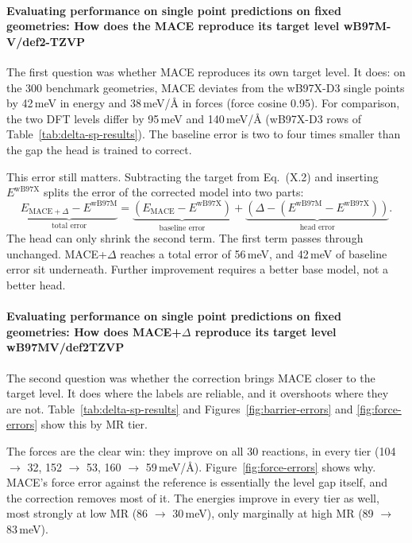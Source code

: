 \paragraph{Evaluating performance on single point predictions on fixed geometries: How does the MACE reproduce its target level wB97M-V/def2-TZVP}
The first question was whether MACE reproduces its own target level. It
does: on the 300 benchmark geometries, MACE deviates from the wB97X-D3
single points by 42\,meV in energy and 38\,meV/\AA{} in forces (force
cosine 0.95). For comparison, the two DFT levels differ by 95\,meV and
140\,meV/\AA{} (wB97X-D3 rows of Table~\ref{tab:delta-sp-results}). The
baseline error is two to four times smaller than the gap the head is
trained to correct.

This error still matters. Subtracting the target from Eq.~(X.2) and
inserting $E^{\text{wB97X}}$ splits the error of the corrected model into
two parts:
\begin{equation}
\underbrace{E_{\text{MACE}+\Delta} - E^{\text{wB97M}}}_{\text{total error}}
=
\underbrace{\left(E_{\text{MACE}} - E^{\text{wB97X}}\right)}_{\text{baseline error}}
+
\underbrace{\left(\Delta - \left(E^{\text{wB97M}} - E^{\text{wB97X}}\right)\right)}_{\text{head error}} .
\label{eq:error-split}
\end{equation}
The head can only shrink the second term. The first term passes through
unchanged. MACE+$\Delta$ reaches a total error of 56\,meV, and 42\,meV of
baseline error sit underneath. Further improvement requires a better base
model, not a better head.


\paragraph{Evaluating performance on single point predictions on fixed geometries: How does MACE+$\Delta$ reproduce its target level wB97MV/def2TZVP}
The second question was whether the correction brings MACE closer to the
target level. It does where the labels are reliable, and it overshoots
where they are not. Table~\ref{tab:delta-sp-results} and
Figures~\ref{fig:barrier-errors} and \ref{fig:force-errors} show this by MR
tier.

The forces are the clear win: they improve on all 30 reactions, in every
tier (104 $\rightarrow$ 32, 152 $\rightarrow$ 53, 160 $\rightarrow$
59\,meV/\AA). Figure~\ref{fig:force-errors} shows why. MACE's force error
against the reference is essentially the level gap itself, and the
correction removes most of it. The energies improve in every tier as well,
most strongly at low MR (86 $\rightarrow$ 30\,meV), only marginally at high
MR (89 $\rightarrow$ 83\,meV).

